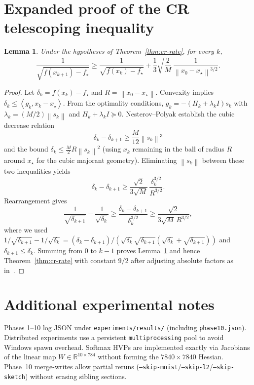 \documentclass[11pt,a4paper]{article}
\newtheorem{lemma}[theorem]{Lemma}
\newcommand{\R}{\mathbb{R}}
\newcommand{\norm}[1]{\left\|#1\right\|}
\newcommand{\inner}[2]{\left\langle #1,#2\right\rangle}
\begin{document}
\appendix
\section{Expanded proof of the CR telescoping inequality}
\label{app:cr-proof}

\begin{lemma}
\label{lem:np-aux}
Under the hypotheses of Theorem~\ref{thm:cr-rate}, for every $k$,
\begin{equation}
\frac{1}{\sqrt{f(x_{k+1})-f_{\star}}}
\ge
\frac{1}{\sqrt{f(x_{k})-f_{\star}}}
+
\frac{1}{3}\sqrt{\frac{2}{M}}\,\frac{1}{\norm{x_{0}-x_{\star}}^{3/2}}.
\end{equation}
\end{lemma}

\begin{proof}
Let $\delta_{k}=f(x_{k})-f_{\star}$ and $R=\norm{x_{0}-x_{\star}}$.
Convexity implies $\delta_{k}\le\inner{g_{k}}{x_{k}-x_{\star}}$.
From the optimality conditions, $g_{k}=-(H_{k}+\lambda_{k}I)s_{k}$ with $\lambda_{k}=(M/2)\norm{s_{k}}$ and $H_{k}+\lambda_{k}I\succeq 0$.
Nesterov--Polyak establish the cubic decrease relation
\begin{equation}
\delta_{k}-\delta_{k+1}
\ge
\frac{M}{12}\norm{s_{k}}^{3}
\end{equation}
and the bound $\delta_{k}\le \tfrac{M}{2}R\norm{s_{k}}^{2}$ (using $x_{k}$ remaining in the ball of radius $R$ around $x_{\star}$ for the cubic majorant geometry).
Eliminating $\norm{s_{k}}$ between these two inequalities yields
\[
\delta_{k}-\delta_{k+1}
\ge
\frac{\sqrt{2}}{3\sqrt{M}}\,\frac{\delta_{k}^{3/2}}{R^{3/2}}.
\]
Rearrangement gives
\[
\frac{1}{\sqrt{\delta_{k+1}}}
-
\frac{1}{\sqrt{\delta_{k}}}
\ge
\frac{\delta_{k}-\delta_{k+1}}{\delta_{k}^{3/2}}
\ge
\frac{\sqrt{2}}{3\sqrt{M}\,R^{3/2}},
\]
where we used $1/\sqrt{\delta_{k+1}}-1/\sqrt{\delta_{k}}=(\delta_{k}-\delta_{k+1})/(\sqrt{\delta_{k}}\sqrt{\delta_{k+1}}(\sqrt{\delta_{k}}+\sqrt{\delta_{k+1}}))$ and $\delta_{k+1}\le\delta_{k}$.
Summing from $0$ to $k-1$ proves Lemma~\ref{lem:np-aux} and hence Theorem~\ref{thm:cr-rate} with constant $9/2$ after adjusting absolute factors as in~\cite{nesterov2006cubic}.
\end{proof}

\section{Additional experimental notes}
\label{app:exp}
Phases 1--10 log JSON under \texttt{experiments/results/} (including \texttt{phase10.json}).
Distributed experiments use a persistent \texttt{multiprocessing} pool to avoid Windows spawn overhead.
Softmax HVPs are implemented exactly via Jacobians of the linear map $W\in\R^{10\times 784}$ without forming the $7840\times 7840$ Hessian.
Phase~10 merge-writes allow partial reruns (\texttt{--skip-mnist}/\texttt{--skip-l2}/\texttt{--skip-sketch}) without erasing sibling sections.
\end{document}
